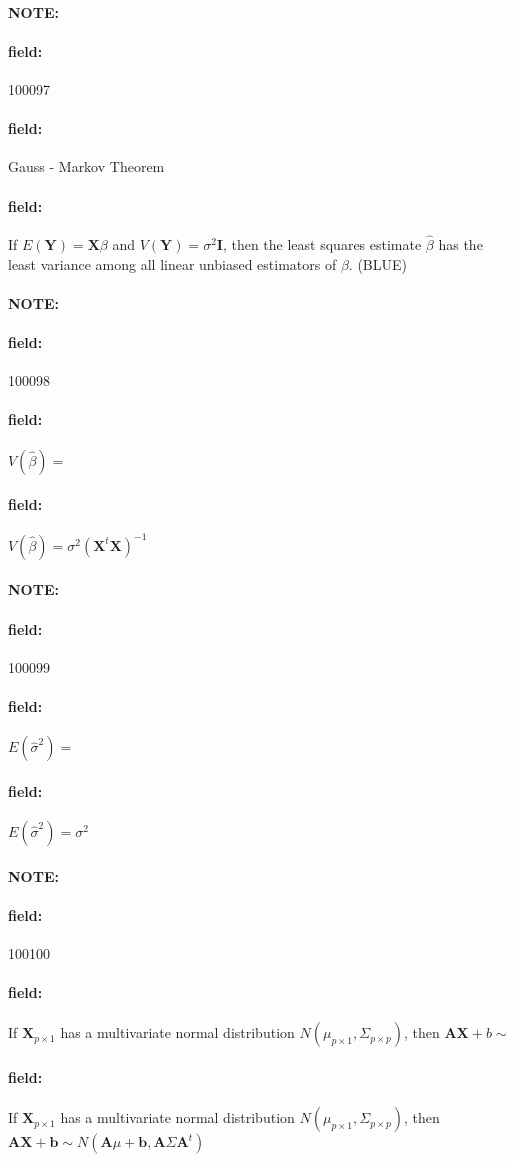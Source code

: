 \documentclass[12pt]{article}
\newenvironment{note}{\paragraph{NOTE:}}{}
\newenvironment{field}{\paragraph{field:}}{}
\begin{document}
\begin{note} \begin{field} \tiny 100097 \end{field}
 \begin{field}
  Gauss - Markov Theorem
 \end{field}
 \begin{field}
  If $E(\mathbf{Y}) = \mathbf{X}\beta$ and $V(\mathbf{Y}) = \sigma^2 \mathbf{I}$, then the least squares estimate $\hat{\beta}$ has the least variance among all linear unbiased estimators of $\beta$. (BLUE)
 \end{field}
\end{note}



\begin{note} \begin{field} \tiny 100098 \end{field}
 \begin{field}
  $V(\hat{\beta}) = $
 \end{field}
 \begin{field}
  $V(\hat{\beta}) = \sigma^2 (\mathbf{X}^t \mathbf{X})^{-1}$
 \end{field}
\end{note}

\begin{note} \begin{field} \tiny 100099 \end{field}
 \begin{field}
  $E(\hat{\sigma}^2) = $
 \end{field}
 \begin{field}
  $E(\hat{\sigma}^2) = \sigma^2$
 \end{field}
\end{note}

\begin{note} \begin{field} \tiny 100100 \end{field}
 \begin{field}
  If $\mathbf{X}_{p \times 1}$ has a multivariate normal distribution $N(\mu_{p\times 1}, \Sigma_{p \times p})$, then $\mathbf{AX} + b \sim $
 \end{field}
 \begin{field}
  If $\mathbf{X}_{p \times 1}$ has a multivariate normal distribution $N(\mu_{p\times 1}, \Sigma_{p \times p})$, then $\mathbf{AX} + \mathbf{b} \sim N(\mathbf{A}\mu + \mathbf{b}, \mathbf{A}\Sigma \mathbf{A}^t)$



 \end{field}
\end{note}
\end{document}
